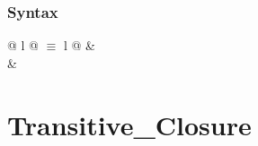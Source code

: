 \begin{isabellebody}
\begin{isamarkuptext}
\subsubsection*{Syntax}

\begin{tabular}{@ {} l @ {\quad$\equiv$\quad} l @ {}}
 & \\
 & \\
\end{tabular}


\section{Transitive\_Closure}


\end{isamarkuptext}
\end{isabellebody}
